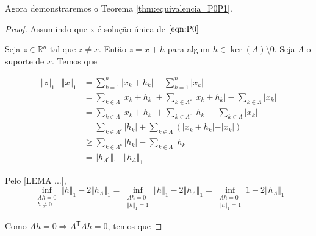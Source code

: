 

Agora demonstraremos o Teorema \ref{thm:equivalencia_P0P1}.
\begin{proof}

Assumindo que x é solução única de $\eqref{eqn:P0}$


Seja $z \in \mathbb{R}^n$ tal que $z \neq x$. Então $z = x + h$ para algum $h \in \ker(A) \setminus{0}$.
Seja $\Lambda$ o suporte de $x$. Temos que

\begin{subequations}
\begin{align*}
\Vert z \Vert_1 - \Vert x \Vert_1 &
= \sum_{k = 1}^n \vert x_k + h_k \vert - \sum_{k = 1}^n \vert x_k \vert \\
& = \sum_{k \in \Lambda} \vert x_k + h_k \vert +
\sum_{k \in \Lambda^{\mathsf{c}}} \vert x_k + h_k \vert
- \sum_{k \in \Lambda} \vert x_k \vert \\
& = \sum_{k \in \Lambda} \vert x_k + h_k \vert +
\sum_{k \in \Lambda^{\mathsf{c}}} \vert h_k \vert
- \sum_{k \in \Lambda} \vert x_k \vert \\
& = \sum_{k \in \Lambda^{\mathsf{c}}} \vert h_k \vert
+ \sum_{k \in \Lambda} \left( \vert x_k + h_k \vert - \vert x_k \vert \right) \\
& \geq \sum_{k \in \Lambda^{\mathsf{c}}} \vert h_k \vert
- \sum_{k \in \Lambda} \vert h_k \vert \\
& = \Vert h_{\Lambda^{\mathsf{c}}} \Vert_1 - \Vert h_\Lambda \Vert_1
\end{align*}
\end{subequations}

Pelo [LEMA ...],
$$\inf_{\substack{Ah = 0 \\ h \neq 0}} \Vert h \Vert_1 - 2 \Vert h_\Lambda \Vert_1
= \inf_{\substack{Ah = 0 \\ \Vert h \Vert_1 = 1}} \Vert h \Vert_1 - 2 \Vert h_\Lambda \Vert_1
= \inf_{\substack{Ah = 0 \\ \Vert h \Vert_1 = 1}} 1 - 2 \Vert h_\Lambda \Vert_1
$$

Como $Ah = 0 \Rightarrow A^{\mathsf{T}} A h = 0$, temos que


\end{proof}
